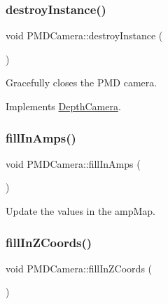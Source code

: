 \subsubsection{\texorpdfstring{destroy\+Instance()}{destroyInstance()}}
{\footnotesize\ttfamily void P\+M\+D\+Camera\+::destroy\+Instance (\begin{DoxyParamCaption}{ }\end{DoxyParamCaption})\hspace{0.3cm}{\ttfamily [virtual]}}



Gracefully closes the P\+MD camera. 



Implements \hyperlink{class_depth_camera_aaf7c09a863e906f61104f23af10a8597}{Depth\+Camera}.

\hypertarget{class_p_m_d_camera_aba055c818c275cf76d73527395937943}{}\label{class_p_m_d_camera_aba055c818c275cf76d73527395937943} 
\subsubsection{\texorpdfstring{fill\+In\+Amps()}{fillInAmps()}}
{\footnotesize\ttfamily void P\+M\+D\+Camera\+::fill\+In\+Amps (\begin{DoxyParamCaption}{ }\end{DoxyParamCaption})\hspace{0.3cm}{\ttfamily [private]}}



Update the values in the amp\+Map. 

\hypertarget{class_p_m_d_camera_a9d67405b9e1e4d4631b218adaa0326ed}{}\label{class_p_m_d_camera_a9d67405b9e1e4d4631b218adaa0326ed} 
\subsubsection{\texorpdfstring{fill\+In\+Z\+Coords()}{fillInZCoords()}}
{\footnotesize\ttfamily void P\+M\+D\+Camera\+::fill\+In\+Z\+Coords (\begin{DoxyParamCaption}{ }\end{DoxyParamCaption})\hspace{0.3cm}{\ttfamily [private]}}



